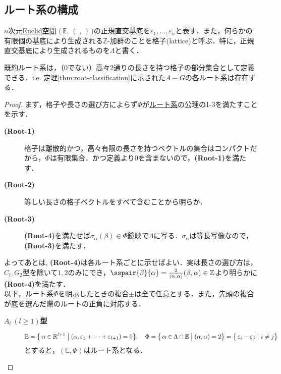 \documentclass[rep_main]{subfiles}
\begin{document}
\subsection{ルート系の構成}
$n$次元\hyperref[def:Euclid-space]{Euclid空間} $\bigl(\, \mathbb{E},\, (\;,\,)\,\bigr)$の正規直交基底を$\varepsilon_1, \ldots, \varepsilon_n$と表す．また，何らかの有限個の基底により生成される$\mathbb{Z}$-加群のことを格子(lattice)と呼ぶ．特に，正規直交基底により生成されるものを$\Lambda$と書く．
\begin{mylem}[label=lem:classification-step-11]{}
	既約ルート系は，（$0$でない）高々2通りの長さを持つ格子の部分集合として定義できる．i.e. 定理\ref{thm:root-classification}に示された$A - G$の各ルート系は存在する．
\end{mylem}
\begin{proof}
	まず，格子や長さの選び方によらず$\Phi$が\hyperref[ax:root-system]{ルート系}の公理の1-3を満たすことを示す．
	\begin{description}
		\item[\textbf{(Root-1)}] 格子は離散的かつ，高々有限の長さを持つベクトルの集合はコンパクトだから，$\Phi$は有限集合．かつ定義より$0$を含まないので，\textbf{(Root-1)}を満たす．
		\item[\textbf{(Root-2)}] 等しい長さの格子ベクトルをすべて含むことから明らか．
		\item[\textbf{(Root-3)}] \textbf{(Root-4)}を満たせば$\sigma_\alpha(\beta) \in \Phi$鏡映で$\Lambda$に写る．$\sigma_\alpha$は等長写像なので，\textbf{(Root-3)}を満たす．
	\end{description}
	よってあとは, \textbf{(Root-4)}は各ルート系ごとに示せばよい．実は長さの選び方は，$C_l, G_2$型を除いて$1, 2$のみにでき，$\sspair{\beta}{\alpha} = \frac{2}{(\alpha, \alpha)}(\beta, \alpha) \in \mathbb{Z}$より明らかに\textbf{(Root-4)}を満たす．\\
	以下，ルート系$\Phi$を明示したときの複合$\pm$は全て任意とする．また，先頭の複合が底を選んだ際のルートの正負に対応する．
	\begin{description}
		\item[\textbf{$A_l\ (l \geq 1)$型}] 
		\begin{equation}
			\mathbb{E} = \bigl\{\, \alpha \in \mathbb{R}^{l+1} \bigm| (\alpha, \varepsilon_1 + \cdots + \varepsilon_{l+1}) = 0\bigr\},\quad  \Phi = \bigl\{\, \alpha \in \Lambda \cap \mathbb{E} \bigm| (\alpha, \alpha) = 2\bigr\} = \bigl\{\, \varepsilon_i - \varepsilon_j \bigm| i \neq j\bigr\} 
		\end{equation}
		とすると，$(\mathbb{E}, \Phi)$はルート系となる．

\end{description}
\end{proof}
\end{document}
